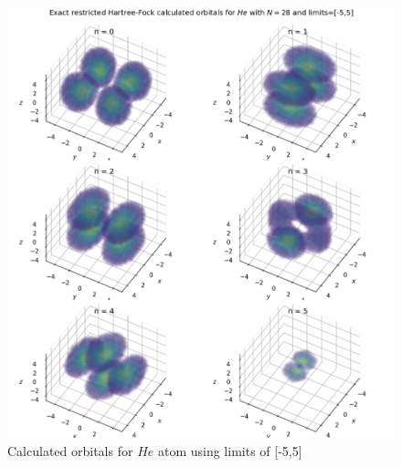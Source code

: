 \documentclass[10pt, oneside, letterpaper]{article}
\begin{document}
\begin{figure}[H]
  \begin{center}
    \includegraphics[scale=0.75]{he_N28_l5.png}
  \end{center}
  \caption{Calculated orbitals for $He$ atom using limits of [-5,5]}
  \label{he-plot-l5}
\end{figure}
\end{document}
